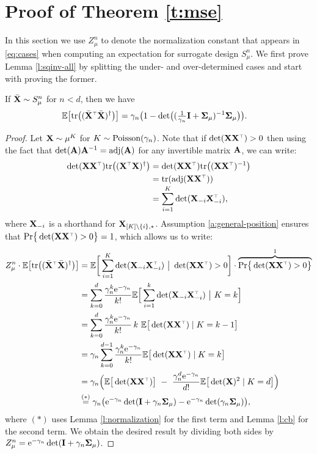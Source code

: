 \section{Proof of Theorem \ref{t:mse}}
\label{a:mse-proof}
In this section we use $Z_\mu^n$ to denote the normalization
constant that appears in \eqref{eq:cases} when computing an expectation for surrogate design
$S_\mu^n$.
We first prove Lemma \ref{l:sqinv-all} by splitting the under- and
over-determined cases and start with proving the former.
\begin{lemma}\label{l:sqinv-under}
If  ${\bar{\mathbf X}}\sim S_\mu^n$ for $n<d$, then we have
\begin{align*}
    \E\big[\tr\big((\Xb^\top\Xb)^{\dagger}\big)\big]
    &={\gamma_n}\big(1- \det\!\big((\tfrac1{\gamma_n}\I+\Sigmab_\mu)^{-1}\Sigmab_\mu\big)\big).
\end{align*}
\end{lemma}
\begin{proof}
Let $\mathbf X\sim\mu^K$ for $K\sim{\operatorname{Poisson}}({\gamma_n})$. Note that if
$\det(\X\X^\top)>0$ then using the fact that
$\det(\mathbf A)\mathbf A^{-1}=\operatorname{\textnormal{adj}}(\mathbf A)$ for any invertible matrix $\mathbf A$, we can write:
  \begin{align*}
    \det(\X\X^\top)\tr\big((\X^\top\X)^{\dagger}\big)
    &= \det(\X\X^\top)\tr\big((\X\X^\top)^{-1}\big) \\
    &= \tr(\adj(\X\X^\top)) \\[-1mm]
    &= \sum_{i=1}^K\det(\X_{-i}\X_{-i}^\top),
  \end{align*}
  where $\mathbf X_{-i}$ is a shorthand for $\mathbf X_{[K]\backslash\{i\},*}$.
Assumption \ref{a:general-position} ensures that
$\Pr\big\{\det(\X\X^\top)>0\big\}=1$, which allows us to write:
  \begin{align*}
Z_\mu^n\cdot \E\big[\tr\big((\Xb^\top\Xb)^{\dagger}\big)\big]
    &=\E\bigg[
    \sum_{i=1}^K\det(\X_{-i}\X_{-i}^\top)\ \big|\
    \det(\X\X^\top)>0\bigg]\cdot\overbrace{\Pr\big\{\det(\X\X^\top)>0\big\}}^{1}\\
    &=\sum_{k=0}^d\frac{\gamma_n^{k}\ee^{-\gamma_n}}{k!}\E\Big[
      \sum_{i=1}^k\det(\X_{-i}\X_{-i}^\top)\ \big|\  K=k\Big]\\
    &=\sum_{k=0}^d\frac{\gamma_n^{k}\ee^{-\gamma_n}}{k!}\, k\
      \E\big[\det(\X\X^\top)\mid K=k-1\big]\\
    &=\gamma_n\sum_{k=0}^{d-1}\frac{\gamma_n^{k}\ee^{-\gamma_n}}{k!}
      \E\big[\det(\X\X^\top)\mid K=k\big]\\
    &=\gamma_n\Big(\E\big[\det(\X\X^\top)\big]\ -\
      \frac{\gamma_n^{d}\ee^{-\gamma_n}}{d!}\E\big[\det(\X)^2\mid K=d\big]
      \Big) \\
    &\overset{(*)}{=}\gamma_n\big(\ee^{-\gamma_n}\det(\I +\gamma_n\Sigmab_\mu) -
      \ee^{-\gamma_n}\det(\gamma_n\Sigmab_\mu)\big),
  \end{align*}
  where $(*)$ uses Lemma \ref{l:normalization} for the first term and
  Lemma \ref{l:cb} for the second term. We obtain the desired result by
  dividing both sides by
  $Z_\mu^n=\mathrm{e}^{-\gamma_n}\det(\mathbf I+\gamma_n\mathbf{\Sigma}_\mu)$.
\end{proof}
